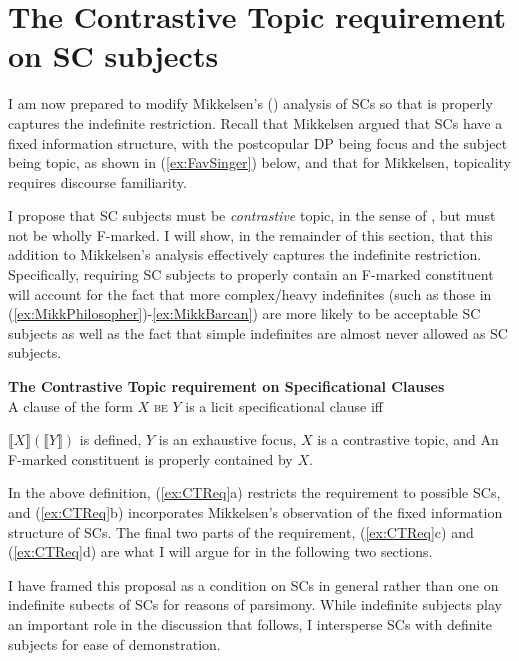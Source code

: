 \documentclass[
	letterpaper,
]{article}
\begin{document}
\section{The Contrastive Topic requirement on SC subjects}\label{sec:MainArgument}
I am now prepared to modify Mikkelsen's (\citeyear{mikkelsen2005copular}) analysis of SCs so that is properly captures the indefinite restriction.
Recall that Mikkelsen argued that SCs have a fixed information structure, with the postcopular DP being focus and the subject being topic, as shown in (\ref{ex:FavSinger}) below, and that for Mikkelsen, topicality requires discourse familiarity.
\begin{exe}
\end{exe}
I propose that SC subjects must be \textit{contrastive} topic, in the sense of \textcite{constant2014diss}, but must not be wholly F-marked.
I will show, in the remainder of this section, that this addition to Mikkelsen's analysis effectively captures the indefinite restriction.
Specifically, requiring SC subjects to properly contain an F-marked constituent will account for the fact that more complex/heavy indefinites (such as those in (\ref{ex:MikkPhilosopher})-\ref{ex:MikkBarcan}) are more likely to be acceptable SC subjects as well as the fact that simple indefinites are almost never allowed as SC subjects.

\begin{exe}
\ex\label{ex:CTReq} \textbf{The Contrastive Topic requirement on Specificational Clauses}\\
A clause of the form $X$ \textsc{be} $Y$ is a licit specificational clause iff
\begin{xlist}
\ex $\llbracket X\rrbracket(\llbracket Y\rrbracket)$ is defined,
\ex $Y$ is an exhaustive focus, \parencite{mikkelsen2005copular}
\ex $X$ is a contrastive topic, and
\ex An F-marked constituent is properly contained by $X$.	
\end{xlist}
\end{exe}

In the above definition, (\ref{ex:CTReq}a) restricts the requirement to possible SCs, and (\ref{ex:CTReq}b) incorporates Mikkelsen's observation of the fixed information structure of SCs.
The final two parts of the requirement, (\ref{ex:CTReq}c) and (\ref{ex:CTReq}d) are what I will argue for in the following two sections.

I have framed this proposal as a condition on SCs in general rather than one on indefinite subects of SCs for reasons of parsimony.
While indefinite subjects play an important role in the discussion that follows, I intersperse SCs with definite subjects for ease of demonstration.
\end{document}
